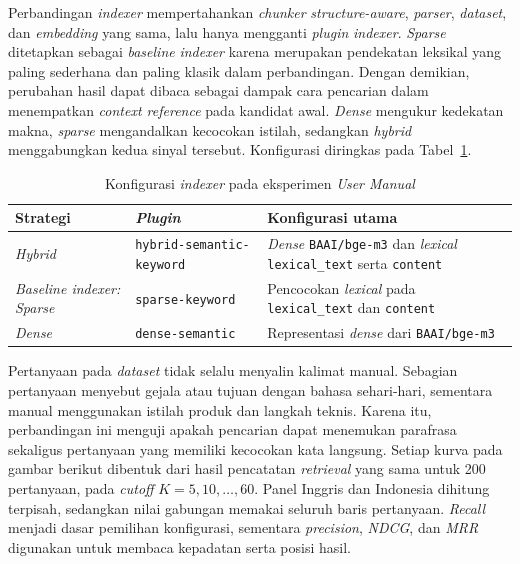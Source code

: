 Perbandingan \emph{indexer} mempertahankan \emph{chunker} \emph{structure-aware}, \emph{parser}, \emph{dataset},
dan \emph{embedding} yang sama, lalu hanya mengganti \emph{plugin} \emph{indexer}. \emph{Sparse} ditetapkan sebagai
\emph{baseline} \emph{indexer} karena merupakan pendekatan leksikal yang paling sederhana dan paling klasik
dalam perbandingan. Dengan demikian, perubahan
hasil dapat dibaca sebagai dampak cara pencarian dalam menempatkan \emph{context reference} pada
kandidat awal. \emph{Dense} mengukur kedekatan makna, \emph{sparse} mengandalkan kecocokan istilah,
sedangkan \emph{hybrid} menggabungkan kedua sinyal tersebut. Konfigurasi diringkas pada
Tabel~\ref{tab:customer-indexer-config}.

\begin{table}[H]
\centering
\scriptsize
\caption{Konfigurasi \emph{indexer} pada eksperimen \emph{User Manual}}
\label{tab:customer-indexer-config}
\begin{tabularx}{\textwidth}{@{}>{\RaggedRight\arraybackslash}p{3.1cm}>{\RaggedRight\arraybackslash}p{4.2cm}>{\RaggedRight\arraybackslash}X@{}}
\toprule
\textbf{Strategi} & \textbf{\emph{Plugin}} & \textbf{Konfigurasi utama}\\
\midrule
\emph{Hybrid} & \texttt{hybrid-semantic-keyword} & \emph{Dense} \texttt{BAAI/bge-m3} dan \emph{lexical} \texttt{lexical\_text} serta \texttt{content}\\
\emph{Baseline indexer: Sparse} & \texttt{sparse-keyword} & Pencocokan \emph{lexical} pada \texttt{lexical\_text} dan \texttt{content}\\
\emph{Dense} & \texttt{dense-semantic} & Representasi \emph{dense} dari \texttt{BAAI/bge-m3}\\
\bottomrule
\end{tabularx}
\end{table}

Pertanyaan pada \emph{dataset} tidak selalu menyalin kalimat manual. Sebagian pertanyaan menyebut
gejala atau tujuan dengan bahasa sehari-hari, sementara manual menggunakan istilah produk dan
langkah teknis. Karena itu, perbandingan ini menguji apakah pencarian dapat menemukan parafrasa
sekaligus pertanyaan yang memiliki kecocokan kata langsung. Setiap kurva pada gambar berikut
dibentuk dari hasil pencatatan \emph{retrieval} yang sama untuk 200 pertanyaan, pada \emph{cutoff} \(K = 5, 10, \ldots, 60\).
Panel Inggris dan Indonesia dihitung terpisah, sedangkan nilai gabungan memakai seluruh baris
pertanyaan. \emph{Recall} menjadi dasar pemilihan konfigurasi, sementara \emph{precision}, \emph{NDCG}, dan \emph{MRR}
digunakan untuk membaca kepadatan serta posisi hasil.

